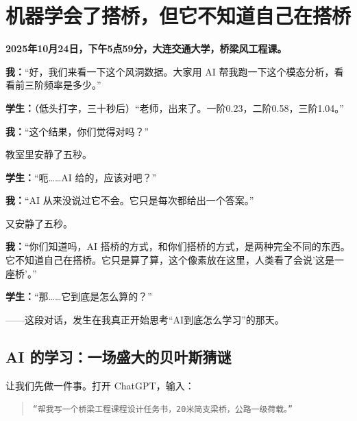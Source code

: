 
\chapter{机器学会了搭桥，但它不知道自己在搭桥}

\begin{classroom-scene}
\label{scene:chap1-intro}

{
\noindent \textbf{2025年10月24日，下午5点59分，大连交通大学，桥梁风工程课。}

\vspace{0.5cm}

\noindent\textbf{我：}“好，我们来看一下这个风洞数据。大家用 AI 帮我跑一下这个模态分析，看看前三阶频率是多少。”

\noindent\textbf{学生：}（低头打字，三十秒后）“老师，出来了。一阶0.23，二阶0.58，三阶1.04。”

\noindent\textbf{我：}“这个结果，你们觉得对吗？”

\noindent 教室里安静了五秒。

\noindent\textbf{学生：}“呃\ldots\ldots AI 给的，应该对吧？”

\noindent\textbf{我：}“AI 从来没说过它不会。它只是每次都给出一个答案。”

\noindent 又安静了五秒。

\noindent\textbf{我：}“你们知道吗，AI 搭桥的方式，和你们搭桥的方式，是两种完全不同的东西。它不知道自己在搭桥。它只是算了算，这个像素放在这里，人类看了会说'这是一座桥'。”

\noindent\textbf{学生：}“那\ldots\ldots 它到底是怎么算的？”
}
\end{classroom-scene}

\vspace{0.5cm}

\begin{center}
{\small\color{muted} ——这段对话，发生在我真正开始思考“AI到底怎么学习”的那天。}
\end{center}

\section{AI 的学习：一场盛大的贝叶斯猜谜}

让我们先做一件事。打开 ChatGPT，输入：

\begin{quote}
\texttt{“帮我写一个桥梁工程课程设计任务书，20米简支梁桥，公路一级荷载。”}
\end{quote}

